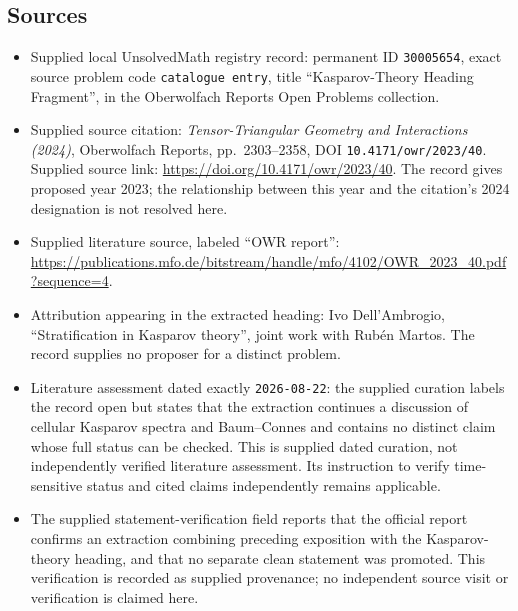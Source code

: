 \documentclass[11pt]{article}
\begin{document}
\subsection{Sources}
\begin{itemize}
\item Supplied local UnsolvedMath registry record: permanent ID \texttt{30005654}, exact source problem code \texttt{catalogue entry}, title ``Kasparov-Theory Heading Fragment'', in the Oberwolfach Reports Open Problems collection.
\item Supplied source citation: \emph{Tensor-Triangular Geometry and Interactions (2024)}, Oberwolfach Reports, pp.~2303--2358, DOI \texttt{10.4171/owr/2023/40}. Supplied source link: \url{https://doi.org/10.4171/owr/2023/40}. The record gives proposed year 2023; the relationship between this year and the citation's 2024 designation is not resolved here.
\item Supplied literature source, labeled ``OWR report'': \url{https://publications.mfo.de/bitstream/handle/mfo/4102/OWR_2023_40.pdf?sequence=4}.
\item Attribution appearing in the extracted heading: Ivo Dell'Ambrogio, ``Stratification in Kasparov theory'', joint work with Rub\'en Martos. The record supplies no proposer for a distinct problem.
\item Literature assessment dated exactly \texttt{2026-08-22}: the supplied curation labels the record open but states that the extraction continues a discussion of cellular Kasparov spectra and Baum--Connes and contains no distinct claim whose full status can be checked. This is supplied dated curation, not independently verified literature assessment. Its instruction to verify time-sensitive status and cited claims independently remains applicable.
\item The supplied statement-verification field reports that the official report confirms an extraction combining preceding exposition with the Kasparov-theory heading, and that no separate clean statement was promoted. This verification is recorded as supplied provenance; no independent source visit or verification is claimed here.
\end{itemize}
\end{document}
